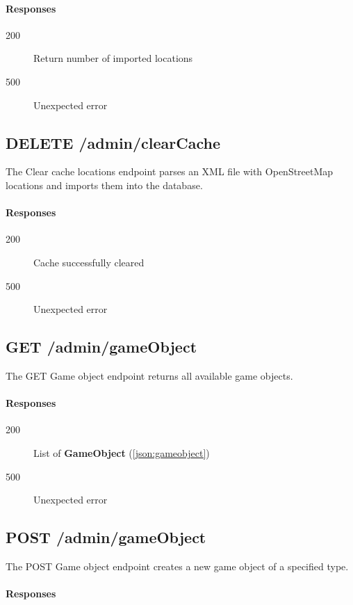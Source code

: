 		\paragraph*{Responses}
			\begin{description}		
				\item[200] Return number of imported locations
				\item[500] Unexpected error
			\end{description}
		
	\subsection{DELETE /admin/clearCache}
	The Clear cache locations endpoint parses an XML file with OpenStreetMap locations and imports them into the database.
		\paragraph*{Responses}
			\begin{description}		
				\item[200] Cache successfully cleared
				\item[500] Unexpected error
			\end{description}
			
	\subsection{GET /admin/gameObject}
	The GET Game object endpoint returns all available game objects.
		\paragraph*{Responses}
			\begin{description}		
				\item[200] List of \textbf{GameObject} (\ref{json:gameobject})
				\item[500] Unexpected error
			\end{description}
			
	\subsection{POST /admin/gameObject}
	The POST Game object endpoint creates a new game object of a specified type.
		\paragraph*{Responses}
